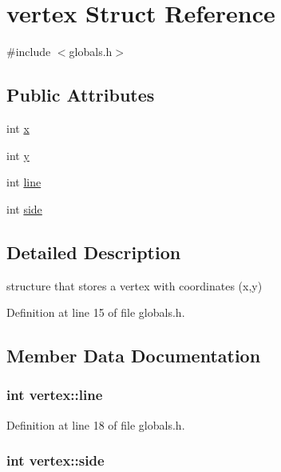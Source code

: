 \hypertarget{structvertex}{}\section{vertex Struct Reference}
\label{structvertex}


{\ttfamily \#include $<$globals.\+h$>$}

\subsection*{Public Attributes}
\begin{DoxyCompactItemize}
\item 
int \hyperlink{structvertex_a170e80128423a8b3307dd7908fc7564c}{x}
\item 
int \hyperlink{structvertex_adc996af0584614ec01cdf8f23bdafc7b}{y}
\item 
int \hyperlink{structvertex_ac9a478d4a5425d7811f4833a73906ca0}{line}
\item 
int \hyperlink{structvertex_aa42cb975cb5cdee54bae090b30b7c9a9}{side}
\end{DoxyCompactItemize}


\subsection{Detailed Description}
structure that stores a vertex with coordinates (x,y) 

Definition at line 15 of file globals.\+h.



\subsection{Member Data Documentation}
\subsubsection[{\texorpdfstring{line}{line}}]{\setlength{\rightskip}{0pt plus 5cm}int vertex\+::line}\hypertarget{structvertex_ac9a478d4a5425d7811f4833a73906ca0}{}\label{structvertex_ac9a478d4a5425d7811f4833a73906ca0}


Definition at line 18 of file globals.\+h.

\subsubsection[{\texorpdfstring{side}{side}}]{\setlength{\rightskip}{0pt plus 5cm}int vertex\+::side}\hypertarget{structvertex_aa42cb975cb5cdee54bae090b30b7c9a9}{}\label{structvertex_aa42cb975cb5cdee54bae090b30b7c9a9}


